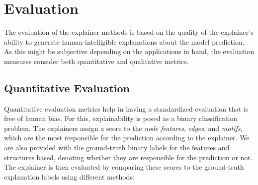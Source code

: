 
\section{Evaluation}
\label{sec:sourav_:eval}
The evaluation of the explainer methods is based on the quality of the explainer's ability to generate human-intelligible explanations about the model prediction. As this might be subjective depending on the applications in hand, the evaluation measures consider both quantitative and qualitative metrics.


\subsection{Quantitative Evaluation}
Quantitative evaluation metrics help in having a standardized evaluation that is free of human bias. 
For this, explainability is posed as a binary classification problem. The explainers assign a score to the \textit{node features}, \textit{edges}, and \textit{motifs}, which are the most responsible for the prediction according to the explainer. We are also provided with the ground-truth binary labels for the features and structures based, denoting whether they are responsible for the prediction or not. The explainer is then evaluated by comparing these scores to the ground-truth explanation labels using different methods: 



